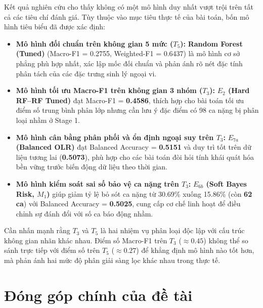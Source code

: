 Kết quả nghiên cứu cho thấy không có một mô hình duy nhất vượt trội trên tất cả các tiêu chí đánh giá. Tùy thuộc vào mục tiêu thực tế của bài toán, bốn mô hình tiêu biểu đã được xác định:
\begin{itemize}
    \item \textbf{Mô hình đối chuẩn trên không gian 5 mức ($T_5$):} \textbf{Random Forest (Tuned)} (Macro-F1 = 0.2755, Weighted-F1 = 0.6437) là mô hình cơ sở phẳng phù hợp nhất, xác lập mốc đối chuẩn và phản ánh rõ nét đặc tính phân tách của các đặc trưng sinh lý ngoại vi.
    \item \textbf{Mô hình tối ưu Macro-F1 trên không gian 3 nhóm ($T_3$):} \textbf{$E_2$ (Hard RF--RF Tuned)} đạt Macro-F1 = \textbf{0.4586}, thích hợp cho bài toán tối ưu điểm số trung bình phân lớp nhưng cần lưu ý đặc điểm có 98 ca nặng bị phân loại nhầm ở Stage 1.
    \item \textbf{Mô hình cân bằng phân phối và ổn định ngoại suy trên $T_3$:} \textbf{$E_{7a}$ (Balanced OLR)} đạt Balanced Accuracy = \textbf{0.5151} và duy trì tốt trên dữ liệu tương lai (\textbf{0.5073}), phù hợp cho các bài toán đòi hỏi tính khái quát hóa bền vững trước biến động dữ liệu theo thời gian.
    \item \textbf{Mô hình kiểm soát sai số bảo vệ ca nặng trên $T_3$:} \textbf{$E_{6b}$ (Soft Bayes Risk, $M_1$)} giúp giảm tỷ lệ bỏ sót ca nặng từ 30.69\% xuống 15.86\% (còn \textbf{62 ca}) với Balanced Accuracy = \textbf{0.5025}, cung cấp cơ chế linh hoạt để điều chỉnh sự đánh đổi với số ca báo động nhầm.
\end{itemize}

Cần nhấn mạnh rằng $T_3$ và $T_5$ là hai nhiệm vụ phân loại độc lập với cấu trúc không gian nhãn khác nhau. Điểm số Macro-F1 trên $T_3$ ($\approx 0.45$) không thể so sánh trực tiếp với điểm số trên $T_5$ ($\approx 0.27$) để khẳng định mô hình nào tốt hơn, mà phản ánh hai mức độ phân giải sàng lọc khác nhau trong thực tế.

\section{Đóng góp chính của đề tài}
\label{sec:dong-gop-de-tai}

